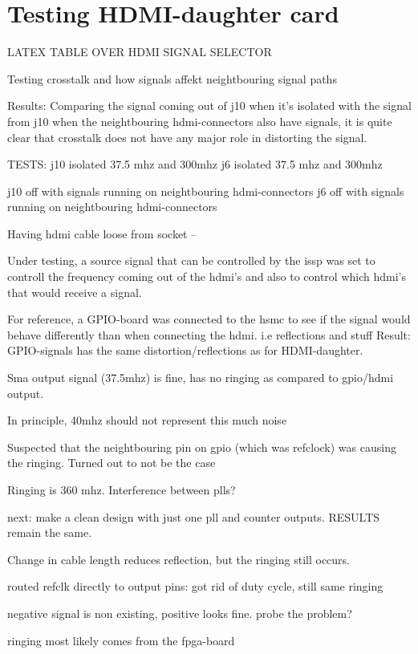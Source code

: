 \documentclass[main.tex]{subfiles}
\begin{document}
\chapter{Testing HDMI-daughter card}

LATEX TABLE OVER HDMI SIGNAL SELECTOR

Testing crosstalk and how signals affekt neightbouring signal paths

Results:
Comparing the signal coming out of j10 when it's isolated with the signal from j10 when the neightbouring hdmi-connectors also have signals, it is quite clear that crosstalk does not have any major role in distorting the signal.

TESTS:
j10 isolated 37.5 mhz and 300mhz 
j6 isolated 37.5 mhz and 300mhz

j10 off with signals running on neightbouring hdmi-connectors
j6 off with signals running on neightbouring hdmi-connectors

Having hdmi cable loose from socket
--

Under testing, a source signal that can be controlled by the issp was set to controll the frequency coming out of the hdmi's and also to control which hdmi's that would receive a signal.

For reference, a GPIO-board was connected to the hsmc to see if the signal would behave differently than when connecting the hdmi. i.e reflections and stuff
Result: GPIO-signals has the same distortion/reflections as for HDMI-daughter.

Sma output signal (37.5mhz) is fine, has no ringing as compared to gpio/hdmi output.

In principle, 40mhz should not represent this much noise

Suspected that the neightbouring pin on gpio (which was refclock) was causing the ringing. Turned out to not be the case

Ringing is 360 mhz. Interference between plls?

next: make a clean design with just one pll and counter outputs. RESULTS remain the same.

Change in  cable length reduces reflection, but the ringing still occurs.

routed refclk directly to output pins: got rid of duty cycle, still same ringing

negative signal is non existing, positive looks fine. probe the problem?

ringing most likely comes from the fpga-board
\end{document}
